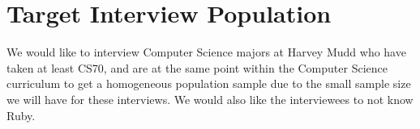 \documentclass{article}
\begin{document}
\section{Target Interview Population}
We would like to interview Computer Science majors at Harvey Mudd who have taken at least CS70, and are at the same point within the Computer Science curriculum to get a homogeneous population sample due to the small sample size we will have for these interviews. We would also like the interviewees to not know Ruby.
\end{document}
